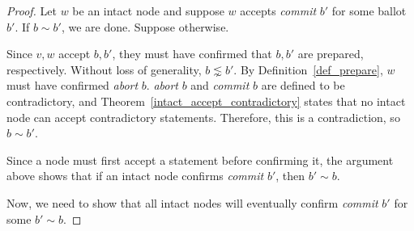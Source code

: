 \begin{proof}
    Let $w$ be an intact node and suppose $w$ accepts \textit{commit} $b'$ for some ballot $b'$.
    If $b \sim b'$, we are done.
    Suppose otherwise.

    Since $v, w$ accept $b, b'$, they must have confirmed that $b, b'$ are prepared, respectively.
    Without loss of generality, $b \lnsim b'$.
    By Definition~\ref{def_prepare}, $w$ must have confirmed \textit{abort} $b$.
    \textit{abort} $b$ and \textit{commit} $b$ are defined to be contradictory, and Theorem~\ref{intact_accept_contradictory} states that no intact node can accept contradictory statements.
    Therefore, this is a contradiction, so $b \sim b'$.

    Since a node must first accept a statement before confirming it, the argument above shows that if an intact node confirms \textit{commit} $b'$, then $b' \sim b$.
    
    Now, we need to show that all intact nodes will eventually confirm \textit{commit} $b'$ for some $b' \sim b$.
\end{proof}
